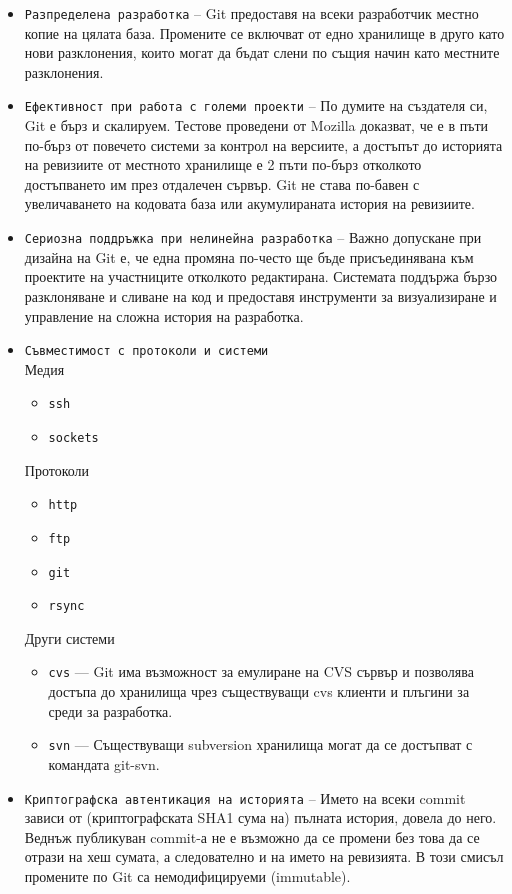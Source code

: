 \documentclass[a4paper]{article}
\begin{document}
    \begin{itemize}
      \item \texttt{Разпределена разработка} -- Git предоставя на всеки разработчик местно копие на цялата база. Промените се включват от едно хранилище в друго като нови разклонения, които могат да бъдат слени по същия начин като местните разклонения.
      \item \texttt{Ефективност при работа с големи проекти} -- По думите на създателя си, Git е бърз и скалируем. Тестове проведени от Mozilla доказват, че е в пъти по-бърз от повечето системи за контрол на версиите, а достъпът до историята на ревизиите от местното хранилище е 2 пъти по-бърз отколкото достъпването им през отдалечен сървър. Git не става по-бавен с увеличаването на кодовата база или акумулираната история на ревизиите.
      \item \texttt{Сериозна поддръжка при нелинейна разработка} -- Важно допускане при дизайна на Git е, че една промяна по-често ще бъде присъединявана към проектите на участниците отколкото редактирана. Системата поддържа бързо разклоняване и сливане на код и предоставя инструменти за визуализиране и управление на сложна история на разработка.
      \item \texttt{Съвместимост с протоколи и системи} \\
        Медия
        \begin{itemize}
          \item \texttt{ssh}
          \item \texttt{sockets}
        \end{itemize}
        Протоколи
        \begin{itemize}
          \item \texttt{http}
          \item \texttt{ftp}
          \item \texttt{git}
          \item \texttt{rsync}
        \end{itemize}
        Други системи
        \begin{itemize}
          \item \texttt{cvs} --- Git има възможност за емулиране на CVS сървър и позволява достъпа до хранилища чрез съществуващи cvs клиенти и плъгини за среди за разработка.
          \item \texttt{svn} --- Съществуващи subversion хранилища могат да се достъпват с командата git-svn.
        \end{itemize}
      \item \texttt{Криптографска автентикация на историята} -- Името на всеки commit зависи от (криптографската SHA1 сума на) пълната история, довела до него. Веднъж публикуван commit-а не е възможно да се промени без това да се отрази на хеш сумата, а следователно и на името на ревизията. В този смисъл промените по Git са немодифицируеми (immutable).

\end{itemize}
\end{document}
